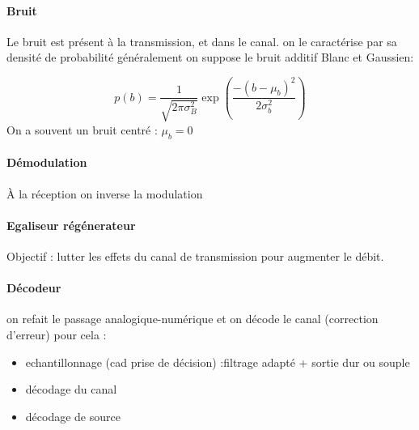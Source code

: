 \documentclass[main.tex]{subfiles}
\begin{document}
\paragraph{Bruit}
Le bruit est présent à la transmission, et dans le canal. on le caractérise par sa densité de probabilité généralement on suppose le bruit additif Blanc et Gaussien:

\[
  p(b) = \frac{1}{\sqrt{2\pi \sigma_B^2}} \exp\left(\frac{-(b-\mu_b)^2}{2\sigma_b^2}\right)
\]
On a souvent un bruit centré : $\mu_b=0$

\paragraph{Démodulation}
À la réception on inverse la modulation
\begin{exemple}

\end{exemple}
\paragraph{Egaliseur régénerateur}
Objectif : lutter les effets du canal de transmission pour augmenter le débit.

\paragraph{Décodeur}
on refait le passage analogique-numérique et on décode le canal (correction d'erreur) pour cela :
\begin{itemize}
\item echantillonnage (cad prise de décision) :filtrage adapté + sortie dur ou souple
\item décodage du canal
\item décodage de source
\end{itemize}
\end{document}
